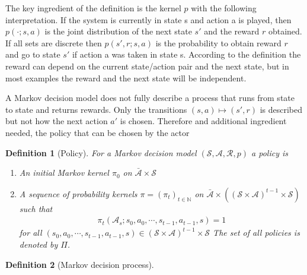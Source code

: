 \documentclass[10pt,a4paper]{article}
\newtheorem{definition}{Definition}
\begin{document}
The key ingredient of the definition is the kernel $p$ with the following interpretation.
If the system is currently in state s and action a is played, then $p(\cdot ; s, a)$ is the joint
distribution of the next state $s'$ and the reward $r$ obtained. 
If all sets are discrete then $p(s', r; s, a)$ is the probability to obtain reward $r$ and go to state $s'$
if action a was taken in state s. According to the definition the reward can depend on the
current state/action pair and the next state, but in most examples the reward and the next state will be independent. 

A Markov decision model does not fully describe a
process that runs from state to state and returns rewards. Only the transitions $(s, a) \mapsto (s',  r)$ is described but not how the next action $a'$ is chosen. Therefore and additional ingredient needed, the policy that can be chosen by the actor

\begin{definition}[Policy]
	For a Markov decision model $(\mathcal S, \mathcal A, \mathcal R, p)$ a policy is 
	\begin{enumerate}
		\item An initial Markov kernel $\pi_0$ on $\bar{\mathcal A}  \times \mathcal S$
		\item A sequence of probability kernels $\pi = (\pi_t)_{t \in \mathbb N}$ on $\bar{\mathcal A}  \times ((\mathcal S \times \mathcal A)^{t-1} \times \mathcal S)$ such that 
		\begin{align*}
			\pi_t(\mathcal A_s; s_0, a_0, \cdots, s_{t-1}, a_{t-1}, s) = 1
		\end{align*}
		for all $(s_0, a_0, \cdots, s_{t-1}, a_{t-1}, s) \in (\mathcal S \times \mathcal A)^{t-1} \times \mathcal S$
		The set of all policies is denoted by $\Pi$.
	\end{enumerate}	
\end{definition}

\begin{definition}[Markov decision process]
\end{definition}


\end{document}
